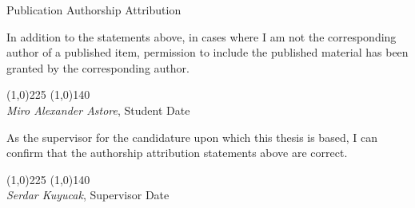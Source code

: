\newpage
\begin{center}
\begin{Large}
\begin{bfseries}
Publication Authorship Attribution
\end{bfseries}
\end{Large}
\end{center}

\vspace{0.3in}
\noindent In addition to the statements above, in cases where I am not the 
corresponding author of a published item, permission to include the published 
material has been granted by the corresponding author.

\vspace{1.in}


\noindent \line(1,0){225} \hspace{3.0cm} \line(1,0){140} \\
 {\em Miro Alexander Astore}, Student \hspace{6.65cm} Date
 
 \vspace{1in}

\noindent As the supervisor for the candidature upon which this thesis is based, 
I can confirm that the authorship attribution statements above are correct.

\vspace{1in}


\noindent \line(1,0){225} \hspace{3.0cm} \line(1,0){140} \\
{\em Serdar Kuyucak}, Supervisor \hspace{5.7cm} Date
